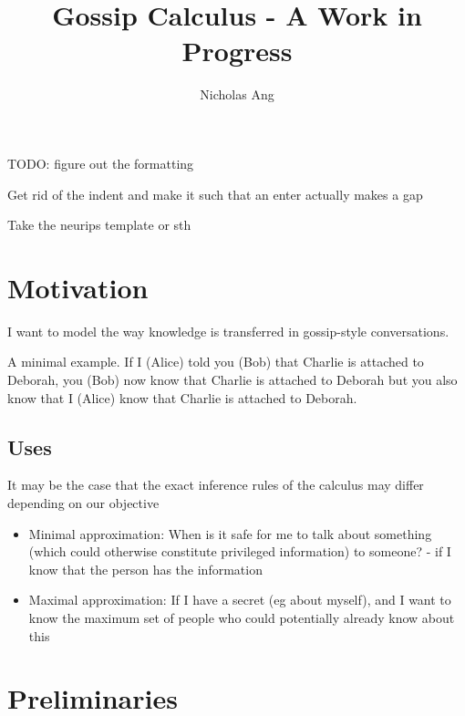 \documentclass[12pt,a4paper]{article}
\begin{document}
\title{Gossip Calculus - A Work in Progress}
\author{Nicholas Ang}
\maketitle

TODO: figure out the formatting 

Get rid of the indent and make it such that an enter actually makes a gap

Take the neurips template or sth

\section{Motivation}
I want to model the way knowledge is transferred in gossip-style conversations.

A minimal example. If I (Alice) told you (Bob) that Charlie is attached to Deborah, you (Bob) now know that Charlie is attached to Deborah but you also know that I (Alice) know that Charlie is attached to Deborah.

\subsection{Uses}
It may be the case that the exact inference rules of the calculus may differ depending on our objective

\begin{itemize}
\item Minimal approximation: When is it safe for me to talk about something (which could otherwise constitute privileged information) to someone? - if I know that the person has the information

\item Maximal approximation: If I have a secret (eg about myself), and I want to know the maximum set of people who could potentially already know about this

\end{itemize}

\section{Preliminaries}
\end{document}
